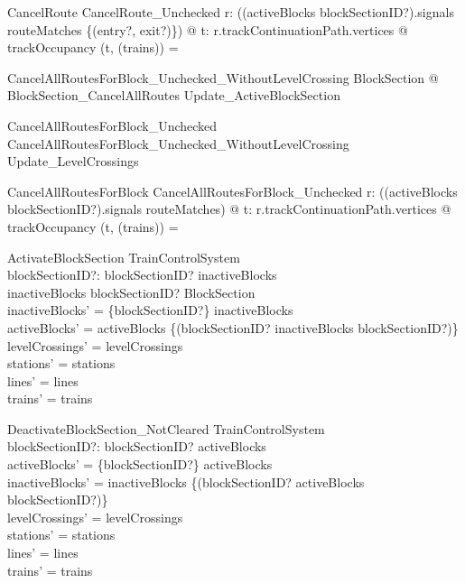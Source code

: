 \begin{schema}{CancelRoute}
  CancelRoute\_Unchecked
\where
  \forall  r: \dom  (\dom  (activeBlocks blockSectionID?).signals \dres  routeMatches \rres  \{(entry?, exit?)\}) @ \forall  t: \ran  r.trackContinuationPath.vertices @ trackOccupancy (t, (\ran  trains)) = \emptyset
\end{schema}

\begin{zed}
CancelAllRoutesForBlock\_Unchecked\_WithoutLevelCrossing  \exists  \Delta BlockSection @ BlockSection\_CancelAllRoutes \land  Update\_ActiveBlockSection
\end{zed}

\begin{zed}
CancelAllRoutesForBlock\_Unchecked  CancelAllRoutesForBlock\_Unchecked\_WithoutLevelCrossing \semi  Update\_LevelCrossings
\end{zed}

\begin{schema}{CancelAllRoutesForBlock}
  CancelAllRoutesForBlock\_Unchecked
\where
  \forall  r: \dom  (\dom  (activeBlocks blockSectionID?).signals \dres  routeMatches) @ \forall  t: \ran  r.trackContinuationPath.vertices @ trackOccupancy (t, (\ran  trains)) = \emptyset
\end{schema}

\begin{schema}{ActivateBlockSection}
  \Delta TrainControlSystem\\
  blockSectionID?: \nat 
\where
  blockSectionID? \in  \dom  inactiveBlocks\\
  inactiveBlocks blockSectionID? \in  BlockSection\\
  inactiveBlocks' = \{blockSectionID?\} \ndres  inactiveBlocks\\
  activeBlocks' = activeBlocks \oplus  \{(blockSectionID? \mapsto  inactiveBlocks blockSectionID?)\}\\
  levelCrossings' = levelCrossings\\
  stations' = stations\\
  lines' = lines\\
  trains' = trains
\end{schema}

\begin{schema}{DeactivateBlockSection\_NotCleared}
  \Delta TrainControlSystem\\
  blockSectionID?: \nat 
\where
  blockSectionID? \in  \dom  activeBlocks\\
  activeBlocks' = \{blockSectionID?\} \ndres  activeBlocks\\
  inactiveBlocks' = inactiveBlocks \oplus  \{(blockSectionID? \mapsto  activeBlocks blockSectionID?)\}\\
  levelCrossings' = levelCrossings\\
  stations' = stations\\
  lines' = lines\\
  trains' = trains
\end{schema}

